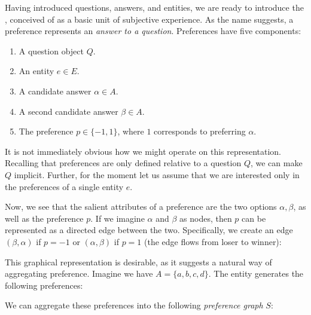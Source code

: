 \bigskip

Having introduced questions, answers, and entities, we are ready to introduce the , conceived of as a basic unit of subjective experience. As the name suggests, a preference represents an \textit{answer to a question}. Preferences have five components:

\begin{enumerate}
	\item A question object $Q$.
	\item An entity $e \in E$.
	\item A candidate answer $\alpha \in A$.
	\item A second candidate answer $\beta \in A$.
	\item The preference $p \in \{-1, 1\}$, where $1$ corresponds to preferring $\alpha$.
\end{enumerate}

It is not immediately obvious how we might operate on this representation. Recalling that preferences are only defined relative to a question $Q$, we can make $Q$ implicit. Further, for the moment let us assume that we are interested only in the preferences of a single entity $e$.

Now, we see that the salient attributes of a preference are the two options $\alpha, \beta$, as well as the preference $p$. If we imagine $\alpha$ and $\beta$ as nodes, then $p$ can be represented as a directed edge between the two. Specifically, we create an edge $(\beta, \alpha)$ if $p = -1$ or $(\alpha, \beta)$ if $p = 1$ (the edge flows from loser to winner):

\begin{center}
\end{center}

This graphical representation is desirable, as it suggests a natural way of aggregating preference. Imagine we have $A = \{a, b, c, d\}$. The entity generates the following preferences:

\begin{center}


\end{center}

We can aggregate these preferences into the following \textit{preference graph} $S$:

